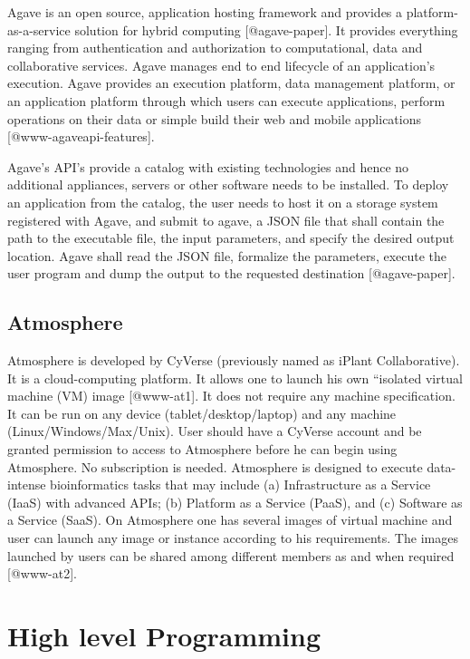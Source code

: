 Agave is an open source, application hosting framework and provides a
platform-as-a-service solution for hybrid
computing [@agave-paper]. It provides everything ranging from
authentication and authorization to computational, data and
collaborative services. Agave manages end to end lifecycle of an
application's execution.  Agave provides an execution platform, data
management platform, or an application platform through which users
can execute applications, perform operations on their data or simple
build their web and mobile applications [@www-agaveapi-features].

Agave's API's provide a catalog with existing technologies and hence
no additional appliances, servers or other software needs to be
installed. To deploy an application from the catalog, the user needs
to host it on a storage system registered with Agave, and submit to
agave, a JSON file that shall contain the path to the executable file,
the input parameters, and specify the desired output location. Agave
shall read the JSON file, formalize the parameters, execute the user
program and dump the output to the requested
destination [@agave-paper].

\subsection{Atmosphere}

Atmosphere is developed by CyVerse (previously named as iPlant
Collaborative).  It is a cloud-computing platform. It allows one to
launch his own ``isolated virtual machine (VM) image [@www-at1].
It does not require any machine specification. It can be run on any
device (tablet/desktop/laptop) and any machine
(Linux/Windows/Max/Unix).  User should have a CyVerse account and be
granted permission to access to Atmosphere before he can begin using
Atmosphere. No subscription is needed.  Atmosphere is designed to
execute data-intense bioinformatics tasks that may include
(a) Infrastructure as a Service (IaaS) with advanced APIs; (b) Platform as
a Service (PaaS), and (c) Software as a Service (SaaS).  On Atmosphere
one has several images of virtual machine and user can launch any
image or instance according to his requirements.  The images launched
by users can be shared among different members as and when
required [@www-at2].

\section{High level Programming}

